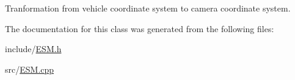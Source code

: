 \-Tranformation from vehicle coordinate system to camera coordinate system. 



\-The documentation for this class was generated from the following files\-:\begin{DoxyCompactItemize}
\item 
include/\hyperlink{ESM_8h}{\-E\-S\-M.\-h}\item 
src/\hyperlink{ESM_8cpp}{\-E\-S\-M.\-cpp}\end{DoxyCompactItemize}
